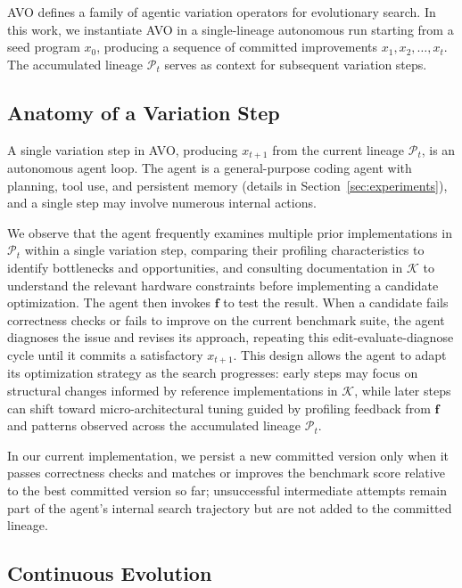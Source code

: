 AVO defines a family of agentic variation operators for evolutionary search. In this work, we instantiate AVO in a single-lineage autonomous run starting from a seed program $x_0$, producing a sequence of committed improvements $x_1, x_2, \ldots, x_t$. The accumulated lineage $\mathcal{P}_t$ serves as context for subsequent variation steps.

\subsection{Anatomy of a Variation Step}
\label{sec:method_step}

A single variation step in AVO, producing $x_{t+1}$ from the current lineage $\mathcal{P}_t$, is an autonomous agent loop.
The agent is a general-purpose coding agent with planning, tool use, and persistent memory (details in Section~\ref{sec:experiments}), and a single step may involve numerous internal actions.

We observe that the agent frequently examines multiple prior implementations in $\mathcal{P}_t$ within a single variation step, comparing their profiling characteristics to identify bottlenecks and opportunities, and consulting documentation in $\mathcal{K}$ to understand the relevant hardware constraints before implementing a candidate optimization.
The agent then invokes $\mathbf{f}$ to test the result.
When a candidate fails correctness checks or fails to improve on the current benchmark suite, the agent diagnoses the issue and revises its approach, repeating this edit-evaluate-diagnose cycle until it commits a satisfactory $x_{t+1}$.
This design allows the agent to adapt its optimization strategy as the search progresses: early steps may focus on structural changes informed by reference implementations in $\mathcal{K}$, while later steps can shift toward micro-architectural tuning guided by profiling feedback from $\mathbf{f}$ and patterns observed across the accumulated lineage $\mathcal{P}_t$.

In our current implementation, we persist a new committed version only when it passes correctness checks and matches or improves the benchmark score relative to the best committed version so far; unsuccessful intermediate attempts remain part of the agent’s internal search trajectory but are not added to the committed lineage.

\subsection{Continuous Evolution}
\label{sec:method_loop}

